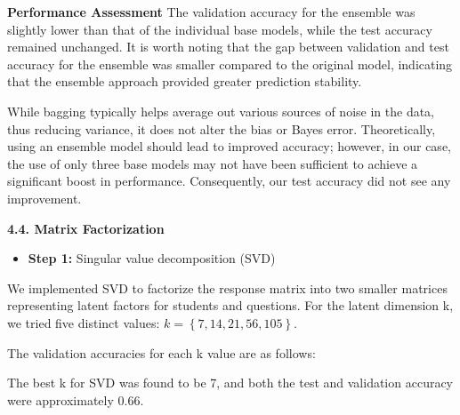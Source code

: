 \documentclass[letterpaper]{article}
\begin{document}
\bigskip

\textbf{Performance Assessment\newline
}The validation accuracy for the ensemble was slightly lower than that of the individual base models, while the test
accuracy remained unchanged. It is worth noting that the gap between validation and test accuracy for the ensemble was
smaller compared to the original model, indicating that the ensemble approach provided greater prediction stability.

While bagging typically helps average out various sources of noise in the data, thus reducing variance, it does not
alter the bias or Bayes error. Theoretically, using an ensemble model should lead to improved accuracy; however, in our
case, the use of only three base models may not have been sufficient to achieve a significant boost in performance.
Consequently, our test accuracy did not see any improvement.


\bigskip

\textbf{4.4. Matrix Factorization}

\begin{itemize}[resume*=listWWNumii]
\item \textbf{Step 1:} Singular value decomposition (SVD)
\end{itemize}

\bigskip

We implemented SVD to factorize the response matrix into two smaller matrices representing latent factors for students
and questions. For the latent dimension k, we tried five distinct values:  $k=\left\{7,14,21,56,105\right\}$. 

The validation accuracies for each k value are as follows: 




The best k for SVD was found to be 7, and both the test and validation accuracy were approximately 0.66.
\end{document}
